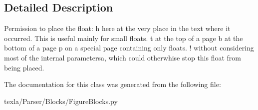 \subsection{Detailed Description}
\begin{DoxyVerb}Permission to place the float:
h here at the very place in the text where it occurred.
This is useful mainly for small floats.
t at the top of a page
b at the bottom of a page
p on a special page containing only floats.
! without considering most of the internal parametersa,
which could otherwhise stop this float from being placed.
\end{DoxyVerb}
 

The documentation for this class was generated from the following file\+:\begin{DoxyCompactItemize}
\item 
texla/\+Parser/\+Blocks/Figure\+Blocks.\+py\end{DoxyCompactItemize}
